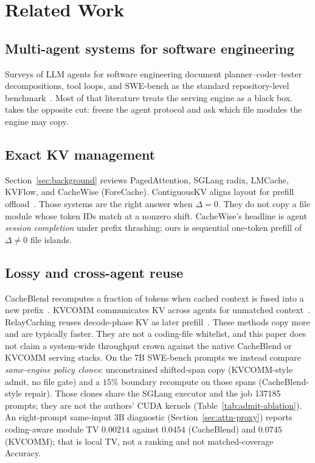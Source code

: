 \section{Related Work}
\label{sec:related-work}

\subsection{Multi-agent systems for software engineering}

Surveys of LLM agents for software engineering document planner--coder--tester
decompositions, tool loops, and SWE-bench as the standard repository-level
benchmark~\cite{llmagents2024,multiagent2025,swebench}. Most of that
literature treats the serving engine as a black box. \method{} takes the
opposite cut: freeze the agent protocol and ask which file modules the
engine may copy.

\subsection{Exact KV management}

Section~\ref{sec:background} reviews PagedAttention, SGLang radix,
LMCache, KVFlow, and CacheWise (ForeCache). ContiguousKV aligns layout
for prefill offload~\cite{contiguouskv}. Those systems are the right
answer when $\Delta = 0$. They do not copy a file module whose token IDs
match at a nonzero shift. CacheWise's headline is agent
\emph{session completion} under prefix thrashing; ours is sequential
one-token prefill of $\Delta\neq 0$ file islands.

\subsection{Lossy and cross-agent reuse}

CacheBlend recomputes a fraction of tokens when cached context is fused
into a new prefix~\cite{yao2024cacheblend}. KVCOMM communicates KV across
agents for unmatched context~\cite{ye2024kvcomm}. RelayCaching reuses
decode-phase KV as later prefill~\cite{relaycaching}. These methods copy
more and are typically faster. They are not a coding-file whitelist, and
this paper does not claim a system-wide throughput crown against the
native CacheBlend or KVCOMM serving stacks. On the 7B SWE-bench prompts
we instead compare \emph{same-engine policy clones}: unconstrained
shifted-span copy (KVCOMM-style admit, no file gate) and a $15\%$
boundary recompute on those spans (CacheBlend-style repair). Those
clones share the SGLang executor and the job 137185 prompts; they are
not the authors' CUDA kernels (Table~\ref{tab:admit-ablation}). An eight-prompt same-input 3B diagnostic
(Section~\ref{sec:attn-proxy}) reports coding-aware module TV $0.00214$
against $0.0454$ (CacheBlend) and $0.0745$ (KVCOMM); that is local TV,
not a ranking and not matched-coverage Accuracy.

